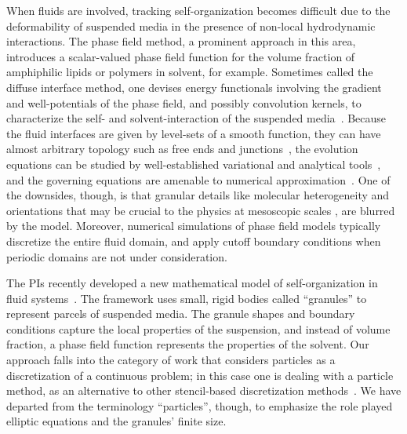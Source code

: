 When fluids are involved, tracking self-organization becomes difficult
due to the deformability of suspended media in the presence of non-local
hydrodynamic interactions. The phase field method, a prominent approach
in this area, introduces a scalar-valued phase field function for the
volume fraction of amphiphilic lipids or polymers in solvent, for
example. Sometimes called the diffuse interface method, one devises
energy functionals involving the gradient and well-potentials of the
phase field, and possibly convolution kernels, to characterize the self-
and solvent-interaction of the suspended
media~\cite{Promislow2022UndulatedBI, C9SM01983A,doi:10.1063/5.0009734,
LiAn-Chang16, Choksi2003OnTD}. Because the fluid interfaces are given by
level-sets of a smooth function, they can have almost arbitrary topology
such as free ends and junctions~\cite{Promislow2017ExistenceBA,
Promislow2022UndulatedBI}, the evolution equations can be studied by
well-established variational and analytical
tools~\cite{Gavish2011CurvatureDF, Dai2019WeakSF, Dai2015CompetitiveGE,
Dai2022GeometricEO, Dai2020MinimizersFT, Dai2013GeometricEO}, and the
governing equations are amenable to numerical
approximation~\cite{Christlieb2020BenchmarkCO,
Christlieb2019CompetitionAC}. One of the downsides, though, is that
granular details like molecular heterogeneity and orientations that may
be crucial to the physics at mesoscopic scales \cite{Midya2022}, are blurred
by the model. Moreover, numerical simulations of phase field
models typically discretize the entire fluid domain, and apply cutoff
boundary conditions when periodic domains are not under consideration. 

The PIs recently developed a new mathematical model of self-organization
in fluid systems~\cite{FuQuRyYo22, fu-ryh-qua-you2022, Fu2018_SIAM}. The
framework uses small, rigid bodies called ``granules'' to represent
parcels of suspended media. The granule shapes and boundary conditions
capture the local properties of the suspension, and instead of volume
fraction, a phase field function represents the properties of the
solvent. Our approach falls into the category of work that considers
particles as a discretization of a continuous problem; in this case one
is dealing with a particle method, as an alternative to other
stencil-based discretization methods~\cite{Wilson2021ComparisonOT,Gross2020MeshfreeMO,
Sigurdsson2016HydrodynamicCO}.
We have departed from the terminology ``particles'', though,
to emphasize the role played elliptic equations and the granules'
finite size.

